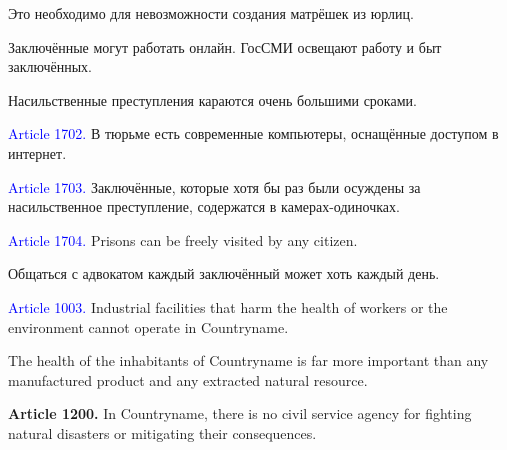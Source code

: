 \documentclass[11pt]{article}
\theoremstyle{remark}
\theoremstyle{definition}
\begin{document}
\color{blue}

Это необходимо для невозможности создания матрёшек из юрлиц.

\color{black}


Заключённые могут работать онлайн. ГосСМИ освещают работу и быт заключённых.

Насильственные преступления караются очень большими сроками.





\textcolor{blue}{Article 1702.} В тюрьме есть современные компьютеры, оснащённые доступом в интернет.

\textcolor{blue}{Article 1703.} Заключённые, которые хотя бы раз были осуждены за насильственное преступление, содержатся в камерах-одиночках.



\textcolor{blue}{Article 1704.} Prisons can be freely visited by any citizen. 




Общаться с адвокатом каждый заключённый может хоть каждый день.










\textcolor{blue}{Article 1003.} Industrial facilities that harm the health of workers or the environment cannot operate in Countryname.

\color{blue}


The health of the inhabitants of Countryname is far more important than any manufactured product and any extracted natural resource.


\color{black}

\textbf{Article 1200.} In Countryname, there is no civil service agency for fighting natural disasters or mitigating their consequences.
\end{document}
